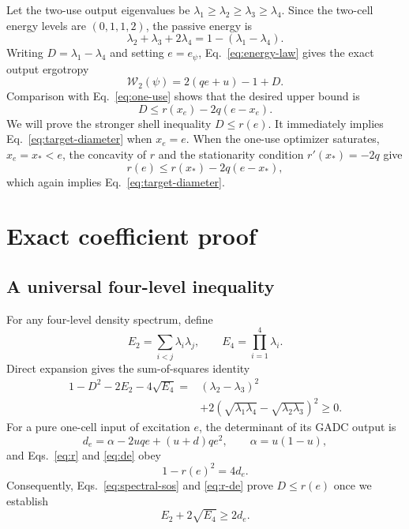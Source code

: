 \documentclass[pra,aps,twocolumn,nofootinbib,superscriptaddress]{revtex4-2}
\newcommand{\W}{\mathcal{W}}
\begin{document}
Let the two-use output eigenvalues be
$\lambda_1\geq\lambda_2\geq\lambda_3\geq\lambda_4$.  Since the two-cell
energy levels are $(0,1,1,2)$, the passive energy is
\begin{equation}
 \lambda_2+\lambda_3+2\lambda_4
 =1-(\lambda_1-\lambda_4).
\end{equation}
Writing $D=\lambda_1-\lambda_4$ and setting $e=e_\psi$, Eq.~\eqref{eq:energy-law}
gives the exact output ergotropy
\begin{equation}
 \W_2(\psi)=2(qe+u)-1+D.
\label{eq:W2-diameter}
\end{equation}
Comparison with Eq.~\eqref{eq:one-use} shows that the desired upper bound is
\begin{equation}
D\leq r(x_e)-2q(e-x_e).
\label{eq:target-diameter}
\end{equation}
We will prove the stronger shell inequality $D\leq r(e)$.  It immediately
implies Eq.~\eqref{eq:target-diameter} when $x_e=e$.  When the one-use
optimizer saturates, $x_e=x_*<e$, the concavity of $r$ and the stationarity
condition $r'(x_*)=-2q$ give
\begin{equation}
r(e)\leq r(x_*)-2q(e-x_*),
\label{eq:tangent}
\end{equation}
which again implies Eq.~\eqref{eq:target-diameter}.

\section{Exact coefficient proof}
\label{sec:proof}

\subsection{A universal four-level inequality}

For any four-level density spectrum, define
\begin{equation}
E_2=\sum_{i<j}\lambda_i\lambda_j,
\qquad E_4=\prod_{i=1}^{4}\lambda_i.
\end{equation}
Direct expansion gives the sum-of-squares identity
\begin{align}
1-D^2-2E_2-4\sqrt{E_4}
={}&(\lambda_2-\lambda_3)^2\nonumber\\
&+2\left(\sqrt{\lambda_1\lambda_4}
-\sqrt{\lambda_2\lambda_3}\right)^2\geq0.
\label{eq:spectral-sos}
\end{align}
For a pure one-cell input of excitation $e$, the determinant of its GADC
output is
\begin{equation}
d_e=\alpha-2uqe+(u+d)qe^2,\qquad \alpha=u(1-u),
\label{eq:de}
\end{equation}
and Eqs.~\eqref{eq:r} and \eqref{eq:de} obey
\begin{equation}
1-r(e)^2=4d_e.
\label{eq:r-de}
\end{equation}
Consequently, Eqs.~\eqref{eq:spectral-sos} and \eqref{eq:r-de} prove
$D\leq r(e)$ once we establish
\begin{equation}
E_2+2\sqrt{E_4}\geq2d_e.
\label{eq:coefficient-target}
\end{equation}
\end{document}
